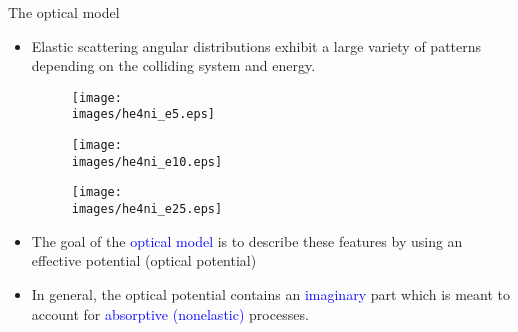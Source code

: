 \documentclass[english,10pt]{beamer}
\newcommand{\bi}{\begin{itemize}}
\newcommand{\ei}{\end{itemize}}
\newcommand{\images}{images}
\begin{document}
\begin{frame}{The optical model}

\bi
\setlength{\itemsep}{18pt}

\item Elastic scattering angular distributions exhibit a large variety of patterns depending on the colliding system and energy. 


\begin{minipage}[t]{.30\textwidth}
\begin{figure}{\par \resizebox*{0.75\textwidth}{!}
{\texttt{[image: \\images/he4ni\_e5.eps]}} \par}
\end{figure}
\end{minipage}
\begin{minipage}[t]{.30\textwidth}
\begin{figure}{\par \resizebox*{0.75\textwidth}{!}
{\texttt{[image: \\images/he4ni\_e10.eps]}} \par}
\end{figure}
\end{minipage}
\begin{minipage}[t]{.30\textwidth}
\begin{figure}{\par \resizebox*{0.75\textwidth}{!}
{\texttt{[image: \\images/he4ni\_e25.eps]}} \par}
\end{figure}
\end{minipage}


\item The goal of the \textcolor{blue}{optical model} is to describe these features by using an effective potential (optical potential)

\item In general, the optical potential contains an \textcolor{blue}{imaginary} part which is meant to account for \textcolor{blue}{absorptive (nonelastic)} processes. 

\ei

\end{frame}
\end{document}
